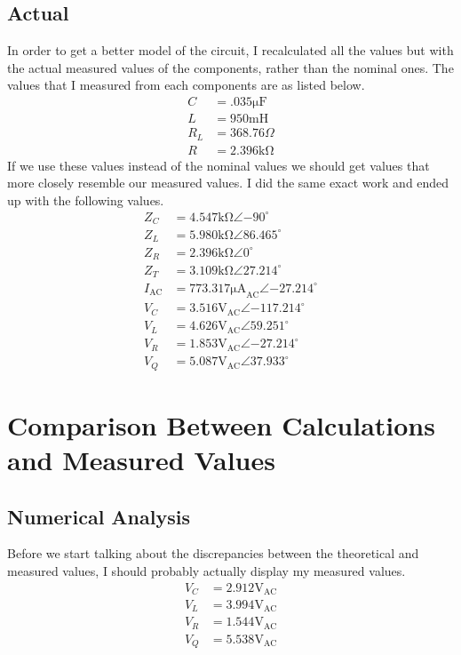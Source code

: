 \documentclass[12pt,a4paper,titlepage]{article}
\begin{document}
\subsection{Actual}
In order to get a better model of the circuit, I recalculated all the values
but with the actual measured values of the components, rather than the nominal
ones. The values that I measured from each components are as listed below.
\begin{align*}
  C &= .035\si{\micro \farad} \\
  L &= 950\si{\milli \henry} \\
  R_L &= 368.76\Omega \\
  R &= 2.396\si{\kilo \ohm}
\end{align*}
If we use these values instead of the nominal values we should get values that
more closely resemble our measured values. I did the same exact work and ended
up with the following values.
\begin{align*}
  Z_C &= 4.547\si{\kilo \ohm} \angle {-90}^{\circ} \\
  Z_L &= 5.980\si{\kilo \ohm} \angle 86.465^{\circ} \\
  Z_R &= 2.396\si{\kilo \ohm} \angle 0^{\circ} \\
  Z_T &= 3.109\si{\kilo \ohm} \angle 27.214^{\circ} \\ 
  I_\text{AC} &= 773.317\si{\micro \ampere}_\text{AC} \angle {-27.214}^{\circ} \\ 
  V_C &= 3.516\si{\volt}_\text{AC} \angle {-117.214}^{\circ} \\
  V_L &= 4.626\si{\volt}_\text{AC} \angle 59.251^{\circ} \\ 
  V_R &= 1.853\si{\volt}_\text{AC} \angle {-27.214}^{\circ} \\
  V_Q &= 5.087\si{\volt}_\text{AC} \angle 37.933^{\circ}
\end{align*}


\section{Comparison Between Calculations and Measured Values}

\subsection{Numerical Analysis}
Before we start talking about the discrepancies between the theoretical and
measured values, I should probably actually display my measured values.
\begin{align*}
  V_C &= 2.912 \si{\volt}_\text{AC} \\
  V_L &= 3.994 \si{\volt}_\text{AC} \\
  V_R &= 1.544 \si{\volt}_\text{AC} \\
  V_Q &= 5.538 \si{\volt}_\text{AC}
\end{align*}
\end{document}
